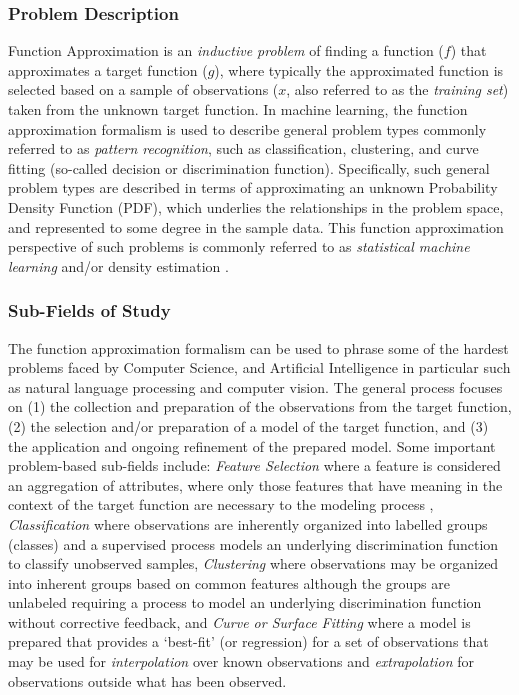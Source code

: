 \documentclass[a4paper, 11pt]{article}
\begin{document}
\subsubsection{Problem Description}
Function Approximation is an \emph{inductive problem} of finding a function ($f$) that approximates a target function ($g$), where typically the approximated function is selected based on a sample of observations ($x$, also referred to as the \emph{training set}) taken from the unknown target function.
In machine learning, the function approximation formalism is used to describe general problem types commonly referred to as \emph{pattern recognition}, such as classification, clustering, and curve fitting (so-called decision or discrimination function). Specifically, such general problem types are described in terms of approximating an unknown Probability Density Function (PDF), which underlies the relationships in the problem space, and represented to some degree in the sample data. This function approximation perspective of such problems is commonly referred to as \emph{statistical machine learning} and/or density estimation \cite{Fukunaga1990, Bishop1995}.


%
%
\subsubsection{Sub-Fields of Study}
The function approximation formalism can be used to phrase some of the hardest problems faced by Computer Science, and Artificial Intelligence in particular such as natural language processing and computer vision. 
The general process focuses on (1) the collection and preparation of the observations from the target function, (2) the selection and/or preparation of a model of the target function, and (3) the application and ongoing refinement of the prepared model. 
Some important problem-based sub-fields include: \emph{Feature Selection} where a feature is considered an aggregation of attributes, where only those features that have meaning in the context of the target function are necessary to the modeling process \cite{Kudo2000, Guyon2003}, \emph{Classification} where observations are inherently organized into labelled groups (classes) and a supervised process models an underlying discrimination function to classify unobserved samples, \emph{Clustering} where observations may be organized into inherent groups based on common features although the groups are unlabeled requiring a process to model an underlying discrimination function without corrective feedback, and \emph{Curve or Surface Fitting} where a model is prepared that provides a `best-fit' (or regression) for a set of observations that may be used for \emph{interpolation} over known observations and \emph{extrapolation} for observations outside what has been observed.
\end{document}
